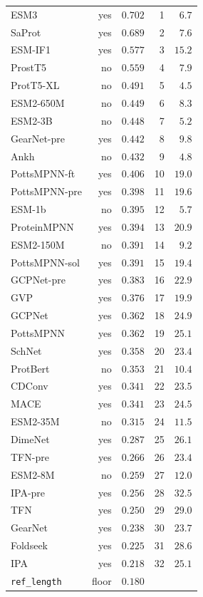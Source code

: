 \begin{longtable}{lrrrr}
ESM3 & yes & $0.702$ & 1 & $6.7$ \\
SaProt & yes & $0.689$ & 2 & $7.6$ \\
ESM-IF1 & yes & $0.577$ & 3 & $15.2$ \\
ProstT5 & no & $0.559$ & 4 & $7.9$ \\
ProtT5-XL & no & $0.491$ & 5 & $4.5$ \\
ESM2-650M & no & $0.449$ & 6 & $8.3$ \\
ESM2-3B & no & $0.448$ & 7 & $5.2$ \\
GearNet-pre & yes & $0.442$ & 8 & $9.8$ \\
Ankh & no & $0.432$ & 9 & $4.8$ \\
PottsMPNN-ft & yes & $0.406$ & 10 & $19.0$ \\
PottsMPNN-pre & yes & $0.398$ & 11 & $19.6$ \\
ESM-1b & no & $0.395$ & 12 & $5.7$ \\
ProteinMPNN & yes & $0.394$ & 13 & $20.9$ \\
ESM2-150M & no & $0.391$ & 14 & $9.2$ \\
PottsMPNN-sol & yes & $0.391$ & 15 & $19.4$ \\
GCPNet-pre & yes & $0.383$ & 16 & $22.9$ \\
GVP & yes & $0.376$ & 17 & $19.9$ \\
GCPNet & yes & $0.362$ & 18 & $24.9$ \\
PottsMPNN & yes & $0.362$ & 19 & $25.1$ \\
SchNet & yes & $0.358$ & 20 & $23.4$ \\
ProtBert & no & $0.353$ & 21 & $10.4$ \\
CDConv & yes & $0.341$ & 22 & $23.5$ \\
MACE & yes & $0.341$ & 23 & $24.5$ \\
ESM2-35M & no & $0.315$ & 24 & $11.5$ \\
DimeNet & yes & $0.287$ & 25 & $26.1$ \\
TFN-pre & yes & $0.266$ & 26 & $23.4$ \\
ESM2-8M & no & $0.259$ & 27 & $12.0$ \\
IPA-pre & yes & $0.256$ & 28 & $32.5$ \\
TFN & yes & $0.250$ & 29 & $29.0$ \\
GearNet & yes & $0.238$ & 30 & $23.7$ \\
Foldseek & yes & $0.225$ & 31 & $28.6$ \\
IPA & yes & $0.218$ & 32 & $25.1$ \\
\midrule
\texttt{ref\_length} & floor & $0.180$ & & \\

\end{longtable}

